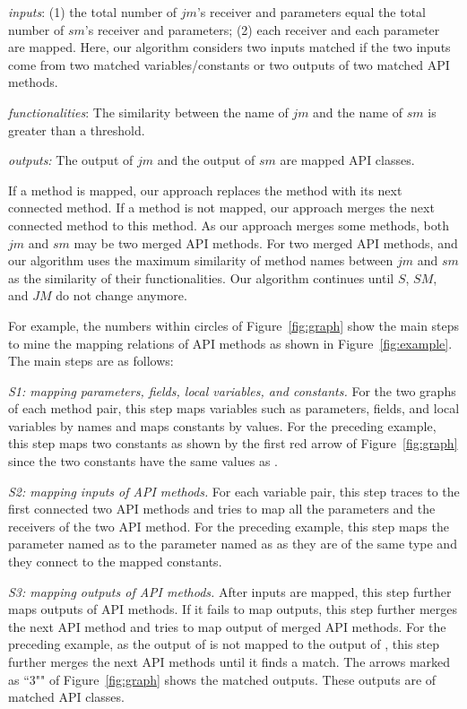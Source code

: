\emph{inputs}: (1) the total number of $jm$'s receiver and
parameters equal the total number of $sm$'s receiver and parameters;
(2) each receiver and each parameter are mapped. Here, our algorithm
considers two inputs matched if the two inputs come from two matched
variables/constants or two outputs of two matched API methods.

\emph{functionalities}: The similarity between the name of $jm$ and
the name of $sm$ is greater than a threshold.

\emph{outputs:} The output of $jm$ and the output of $sm$ are mapped
API classes.

If a method is mapped, our approach replaces the method with its
next connected method. If a method is not mapped, our approach
merges the next connected method to this method. As our approach
merges some methods, both $jm$ and $sm$ may be two merged API
methods. For two merged API methods, and our algorithm uses the
maximum similarity of method names between $jm$ and $sm$ as the
similarity of their functionalities. Our algorithm continues until
$S$, $SM$, and $JM$ do not change anymore.


For example, the numbers within circles of Figure~\ref{fig:graph}
show the main steps to mine the mapping relations of API methods as
shown in Figure~\ref{fig:example}. The main steps are as follows:

\emph{S1: mapping parameters, fields, local variables, and
constants.} For the two graphs of each method pair, this step maps
variables such as parameters, fields, and local variables by names
and maps constants by values. For the preceding example, this step
maps two constants as shown by the first red arrow of
Figure~\ref{fig:graph} since the two constants have the same values
as .

\emph{S2: mapping inputs of API methods.} For each variable pair,
this step traces to the first connected two API methods and tries to
map all the parameters and the receivers of the two API method. For
the preceding example, this step maps the parameter named as
 to the parameter named as  as they
are of the same type and they connect to the mapped constants.

\emph{S3: mapping outputs of API methods.} After inputs are mapped,
this step further maps outputs of API methods. If it fails to map
outputs, this step further merges the next API method and tries to
map output of merged API methods. For the preceding example, as the
output of  is not mapped to the output
of , this step further merges the next
API methods until it finds a match. The arrows marked as ``3"" of
Figure~\ref{fig:graph} shows the matched outputs. These outputs are
of matched API classes.

